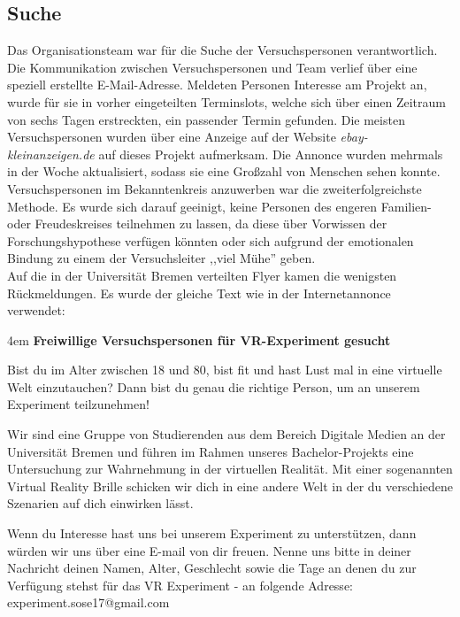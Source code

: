 \documentclass{Bericht}
\begin{document}
\subsection{Suche}
Das Organisationsteam war für die Suche der Versuchspersonen verantwortlich. Die Kommunikation zwischen Versuchspersonen und Team verlief über eine speziell erstellte E-Mail-Adresse. Meldeten Personen Interesse am Projekt an, wurde für sie in vorher eingeteilten Terminslots, welche sich über einen Zeitraum von sechs Tagen erstreckten, ein passender Termin gefunden.
Die meisten Versuchspersonen wurden über eine Anzeige auf der Website \textit{ebay-kleinanzeigen.de} auf dieses Projekt aufmerksam. Die Annonce wurden mehrmals in der Woche aktualisiert, sodass sie eine Großzahl von Menschen sehen konnte.\\
Versuchspersonen im Bekanntenkreis anzuwerben war die zweiterfolgreichste Methode. Es wurde sich darauf geeinigt, keine Personen des engeren Familien- oder Freudeskreises teilnehmen zu lassen, da diese über Vorwissen der Forschungshypothese verfügen könnten oder sich aufgrund der emotionalen Bindung zu einem der Versuchsleiter ,,viel Mühe'' geben.\\
Auf die in der Universität Bremen verteilten Flyer kamen die wenigsten Rückmeldungen. Es wurde der gleiche Text wie in der Internetannonce verwendet:\\

\par
\begingroup
\leftskip4em
\textbf{Freiwillige Versuchspersonen für VR-Experiment gesucht}

Bist du im Alter zwischen 18 und 80, bist fit und hast Lust mal in eine virtuelle Welt einzutauchen? Dann bist du genau die richtige Person, um an unserem Experiment teilzunehmen!

Wir sind eine Gruppe von Studierenden aus dem Bereich Digitale Medien an der Universität Bremen und führen im Rahmen unseres Bachelor-Projekts eine Untersuchung zur Wahrnehmung in der virtuellen Realität. Mit einer sogenannten Virtual Reality Brille schicken wir dich in eine andere Welt in der du verschiedene Szenarien auf dich einwirken lässt.

Wenn du Interesse hast uns bei unserem Experiment zu unterstützen, dann würden wir uns über eine E-mail von dir freuen. Nenne uns bitte in deiner Nachricht deinen Namen, Alter, Geschlecht sowie die Tage an denen du zur Verfügung stehst für das VR Experiment - an folgende Adresse: experiment.sose17@gmail.com \\
\end{document}
